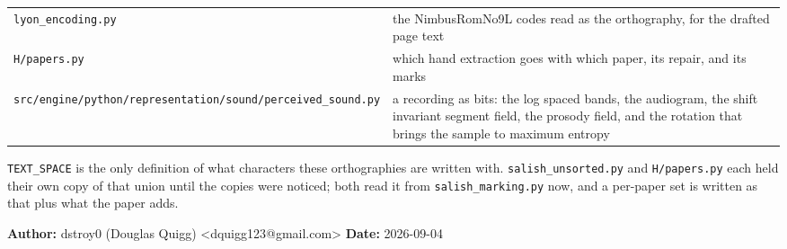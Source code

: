 \begin{longtable}{@{}>{\raggedright\arraybackslash}p{}>{\raggedright\arraybackslash}p{}@{}}
\texttt{lyon\_\allowbreak{}encoding.\allowbreak{}py} & the NimbusRomNo9L codes read as the orthography, for the drafted page text \\
\texttt{H/\allowbreak{}papers.\allowbreak{}py} & which hand extraction goes with which paper, its repair, and its marks \\
\texttt{src/\allowbreak{}engine/\allowbreak{}python/\allowbreak{}representation/\allowbreak{}sound/\allowbreak{}perceived\_\allowbreak{}sound.\allowbreak{}py} & a recording as bits: the log spaced bands, the audiogram, the shift invariant segment field, the prosody field, and the rotation that brings the sample to maximum entropy \\
\bottomrule
\end{longtable}
\normalsize

\texttt{TEXT\_\allowbreak{}SPACE} is the only definition of what characters these orthographies are written with. \texttt{salish\_\allowbreak{}unsorted.\allowbreak{}py} and \texttt{H/\allowbreak{}papers.\allowbreak{}py} each held their own copy of that union until the copies were noticed; both read it from \texttt{salish\_\allowbreak{}marking.\allowbreak{}py} now, and a per-paper set is written as that plus what the paper adds.

\textbf{Author:} dstroy0 (Douglas Quigg) <dquigg123@gmail.com> \textbf{Date:} 2026-09-04

